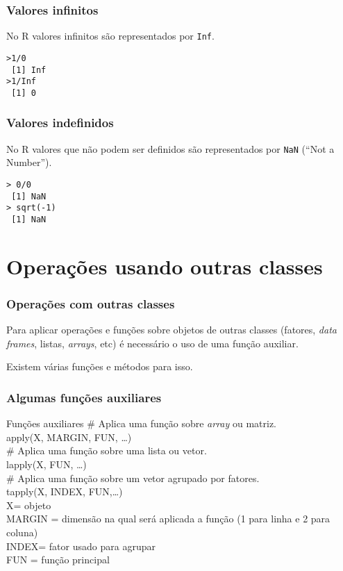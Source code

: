 \documentclass{beamer}
\begin{document}
 \begin{frame}
   \frametitle{Valores infinitos}

No R valores infinitos são representados por \texttt{Inf}.

\texttt{>1/0 \\
~[1] Inf \\
>1/Inf \\
~[1] 0}
 \end{frame}

 \begin{frame}
   \frametitle{Valores indefinidos}

No R valores que não podem ser definidos são representados por \texttt{NaN} (``Not a Number'').

\texttt{> 0/0\\
       ~[1] NaN\\ 
       > sqrt(-1)\\
        ~[1] NaN}

 \end{frame}
\section{Operações usando outras classes}
\begin{frame}
  \frametitle{Operações com outras classes}
 Para aplicar operações e funções sobre objetos de outras classes (fatores, \textit{data frames}, listas, \textit{arrays}, etc) é necessário o uso de uma função  auxiliar.

\pause \vspace{10pt}
Existem várias funções e métodos para isso.
   
\end{frame}

\begin{frame}
  \frametitle{Algumas funções  auxiliares}
  \begin{block}{Funções auxiliares}
    \#   Aplica uma função sobre \textit{array} ou matriz.\\
    apply(X, MARGIN, FUN, \dots)     \\ \vspace{10pt} \pause
    \# Aplica uma função sobre uma lista ou vetor.\\
     lapply(X, FUN, \ldots) \\  \vspace{10pt} \pause
    \#  Aplica uma função sobre um vetor agrupado por fatores.\\
    tapply(X, INDEX, FUN,\dots)\\  \vspace{10pt} \pause
     X= objeto\\
 MARGIN = dimensão na qual será aplicada a função (1 para linha e 2 para coluna)\\
 INDEX= fator usado para agrupar\\
 FUN = função principal
  \end{block} 
\end{frame}
\end{document}
